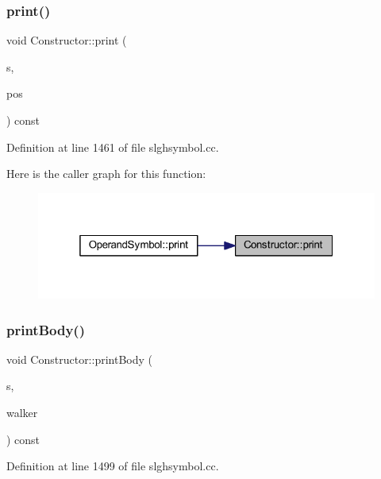 \subsubsection{\texorpdfstring{print()}{print()}}
{\footnotesize\ttfamily void Constructor\+::print (\begin{DoxyParamCaption}\item[{ostream \&}]{s,  }\item[{\mbox{\hyperlink{class_parser_walker}{Parser\+Walker}} \&}]{pos }\end{DoxyParamCaption}) const}



Definition at line 1461 of file slghsymbol.\+cc.

Here is the caller graph for this function\+:
\nopagebreak
\begin{figure}[H]
\begin{center}
\leavevmode
\includegraphics[width=319pt]{class_constructor_af054ebc974542915d6bba232796984d7_icgraph}
\end{center}
\end{figure}
\mbox{\label{class_constructor_a848fb41c8ca95cc49609e017f8934b59}} 
\subsubsection{\texorpdfstring{printBody()}{printBody()}}
{\footnotesize\ttfamily void Constructor\+::print\+Body (\begin{DoxyParamCaption}\item[{ostream \&}]{s,  }\item[{\mbox{\hyperlink{class_parser_walker}{Parser\+Walker}} \&}]{walker }\end{DoxyParamCaption}) const}



Definition at line 1499 of file slghsymbol.\+cc.

